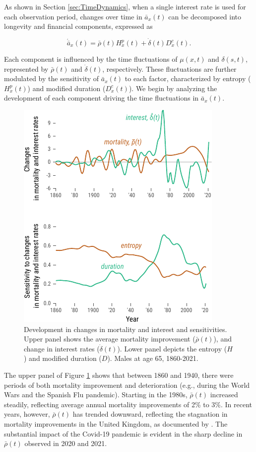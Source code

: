 \documentclass[12pt]{article}
\begin{document}
{As shown in Section \ref{sec:TimeDynamics}, when a single interest rate is used for each observation period, changes over time in \( \bar{a}_x(t) \) can be decomposed into longevity and financial components, expressed as 

\[
\acute{\bar{a}}_x(t) = \bar{\rho}(t) {H}^{p}_x(t) + \dot{\delta}(t) D^{c}_x(t).
\]

Each component is influenced by the time fluctuations of \( \mu(x,t) \) and \( \delta(s,t) \), represented by \( \bar{\rho}(t) \) and \( \dot{\delta}(t) \), respectively. These fluctuations are further modulated by the sensitivity of \( \bar{a}_x(t) \) to each factor, characterized by entropy (\( {H}^{p}_x(t) \)) and modified duration (\( {D}^{c}_x(t) \)). We begin by analyzing the development of each component driving the time fluctuations in \( \bar{a}_x(t) \).

\begin{figure}[H]
	\centering
	\includegraphics[width=0.5\linewidth]{Fig/changeMortalityInterestAndSensitivities}
	\caption{{Development in changes in mortality and interest and sensitivities. Upper panel shows the average mortality improvement ($\bar{\rho}(t)$), and change in interest rates ($\dot{\delta}(t)$). Lower panel depicts the entropy ($H$) and modified duration ($D$). Males at age 65, 1860-2021.}}
	\label{fig:Fig3}
\end{figure}


The upper panel of Figure \ref{fig:Fig3} shows that between 1860 and 1940, there were periods of both mortality improvement and deterioration (e.g., during the World Wars and the Spanish Flu pandemic). Starting in the 1980s, \( \bar{\rho}(t) \) increased steadily, reflecting average annual mortality improvements of 2\% to 3\%. In recent years, however, \( \bar{\rho}(t) \) has trended downward, reflecting the stagnation in mortality improvements in the United Kingdom, as documented by \citet{djeundje2022slowdown}. The substantial impact of the Covid-19 pandemic is evident in the sharp decline in \( \bar{\rho}(t) \) observed in 2020 and 2021.


}
\end{document}
